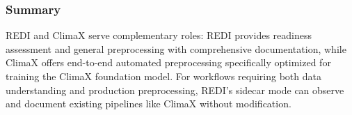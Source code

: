 \subsubsection{Summary}

REDI and ClimaX serve complementary roles: REDI provides readiness assessment and general preprocessing with comprehensive documentation, while ClimaX offers end-to-end automated preprocessing specifically optimized for training the ClimaX foundation model. For workflows requiring both data understanding and production preprocessing, REDI's sidecar mode can observe and document existing pipelines like ClimaX without modification.

